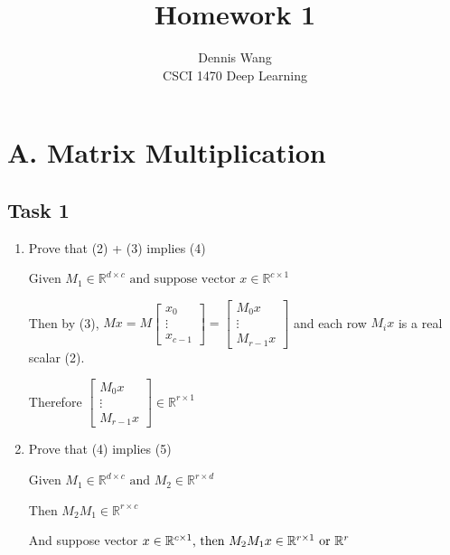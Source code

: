 \documentclass[12pt]{article}
\begin{document}
 
 
\title{Homework 1}
\author{Dennis Wang\\ %
CSCI 1470 Deep Learning }

\maketitle

\section{A. Matrix Multiplication}
\subsection{Task 1}
\begin{enumerate}
  \item Prove that (2) + (3) implies (4)
  
  Given $M_1 \in \mathbb{R}^{d \times c} \text{ and suppose vector } x \in \mathbb{R}^{c\times1}$
  
  Then by (3),  $Mx = M \begin{bmatrix}
  x_0 \\
  
  \vdots \\
  x_{c - 1}
  \end{bmatrix} = \begin{bmatrix}
  M_0 x \\
  \vdots \\
  M_{r-1} x
  \end{bmatrix}$ and each row $M_ix$ is a real scalar (2).
  
  Therefore $\begin{bmatrix}
  M_0 x \\
  \vdots \\
  M_{r-1} x
  \end{bmatrix} \in \mathbb{R}^{r \times 1}$ 
  \item Prove that (4) implies (5)
  
  Given $M_1 \in \mathbb{R}^{d \times c} \text{ and } M_2 \in \mathbb{R}^{r \times d}$
  
  Then $M_2M_1 \in \mathbb{R}^{r \times c}$
  
  And suppose vector $x \in \mathbb{R}^{c \times 1} \text{, then } \\ M_2M_1x \in \mathbb{R}^{r \times 1} \text{ or } \mathbb{R}^r$
\end{enumerate}
\end{document}
